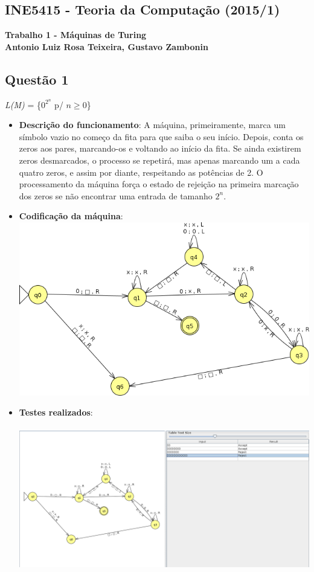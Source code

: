 \documentclass{article}
\begin{document}
\begin{center}
    \section*{INE5415 - Teoria da Computação (2015/1)}
    \textbf{Trabalho 1 - Máquinas de Turing \\
    Antonio Luiz Rosa Teixeira, Gustavo Zambonin}
\end{center}

\subsection*{Questão 1}
\textit{L(M)} = \{$0^{2^{n}}$ p/ $n \geq 0$\}
\begin{itemize}
    \item \textbf{Descrição do funcionamento}: A máquina, primeiramente, marca um símbolo vazio no começo da fita para que saiba o seu início. Depois, conta os zeros aos pares, marcando-os e voltando ao início da fita. Se ainda existirem zeros desmarcados, o processo se repetirá, mas apenas marcando um a cada quatro zeros, e assim por diante, respeitando as potências de 2. O processamento da máquina força o estado de rejeição na primeira marcação dos zeros se não encontrar uma entrada de tamanho $2^{n}$.
    \item \textbf{Codificação da máquina}: \\
    \includegraphics[scale=0.5]{questao1_ss.png}
    \item \textbf{Testes realizados}: \\ \\
    \includegraphics[width=\textwidth]{questao1_inputs.png}
\end{itemize}
\newpage
\end{document}
